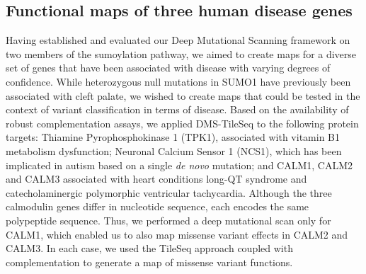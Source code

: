 



\subsection{Functional maps of three human disease genes}

Having established and evaluated our Deep Mutational Scanning framework on two members of the sumoylation pathway, we aimed to create maps for a diverse set of genes that have been associated with disease with varying degrees of confidence. While  heterozygous null mutations in SUMO1 have previously been associated with cleft palate, we wished to create maps that could be tested in the context of variant classification in terms of disease. Based on the availability of robust complementation assays, we applied DMS-TileSeq to the following protein targets: Thiamine Pyrophosphokinase 1 (TPK1), associated with vitamin B1 metabolism dysfunction; Neuronal Calcium Sensor 1 (NCS1), which has been implicated in autism based on a single \textit{de novo} mutation;  and CALM1, CALM2 and CALM3 associated with heart conditions long-QT syndrome and catecholaminergic polymorphic ventricular tachycardia. Although the three calmodulin genes differ in nucleotide sequence, each encodes the same polypeptide sequence. Thus, we performed a deep mutational scan only for CALM1, which enabled us to also map missense variant effects in CALM2 and CALM3. In each case, we used the TileSeq approach coupled with complementation to generate a map of missense variant functions. 


